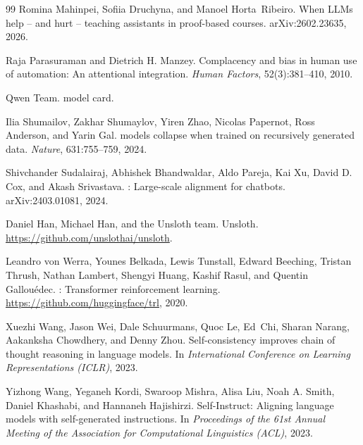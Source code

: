 \documentclass[11pt,a4paper]{article}
\newif\ifdraft
\newcommand{\todo}[2]{%
  \ifdraft\textcolor{red}{\textbf{[TODO #1:} #2\textbf{]}}\fi}
\theoremstyle{definition}
\begin{document}
\begin{thebibliography}{99}
Romina Mahinpei, Sofiia Druchyna, and Manoel Horta~Ribeiro.
\newblock When {LLMs} help -- and hurt -- teaching assistants in proof-based courses.
\newblock arXiv:2602.23635, 2026.

Raja Parasuraman and Dietrich H. Manzey.
\newblock Complacency and bias in human use of automation: An attentional integration.
\newblock \emph{Human Factors}, 52(3):381--410, 2010.

Qwen Team.
 model card.
\newblock \todo{}{add the model card URL and release date}

Ilia Shumailov, Zakhar Shumaylov, Yiren Zhao, Nicolas Papernot, Ross Anderson, and Yarin Gal.
 models collapse when trained on recursively generated data.
\newblock \emph{Nature}, 631:755--759, 2024.

Shivchander Sudalairaj, Abhishek Bhandwaldar, Aldo Pareja, Kai Xu, David D. Cox, and Akash Srivastava.
: Large-scale alignment for chatbots.
\newblock arXiv:2403.01081, 2024.

Daniel Han, Michael Han, and the Unsloth team.
\newblock Unsloth.
\newblock \url{https://github.com/unslothai/unsloth}.

Leandro von Werra, Younes Belkada, Lewis Tunstall, Edward Beeching, Tristan Thrush, Nathan Lambert, Shengyi Huang, Kashif Rasul, and Quentin Gallou{\'e}dec.
: Transformer reinforcement learning.
\newblock \url{https://github.com/huggingface/trl}, 2020.

Xuezhi Wang, Jason Wei, Dale Schuurmans, Quoc Le, Ed~Chi, Sharan Narang, Aakanksha Chowdhery, and Denny Zhou.
\newblock Self-consistency improves chain of thought reasoning in language models.
\newblock In \emph{International Conference on Learning Representations (ICLR)}, 2023.

Yizhong Wang, Yeganeh Kordi, Swaroop Mishra, Alisa Liu, Noah A. Smith, Daniel Khashabi, and Hannaneh Hajishirzi.
\newblock Self-{Instruct}: Aligning language models with self-generated instructions.
\newblock In \emph{Proceedings of the 61st Annual Meeting of the Association for Computational Linguistics (ACL)}, 2023.


\end{thebibliography}
\end{document}
